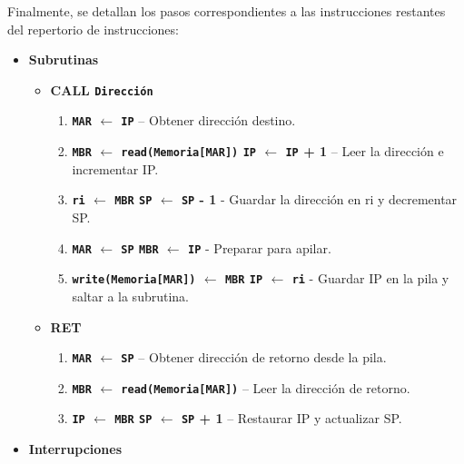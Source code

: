\documentclass[12pt,oneside]{templates/unerthesis}
\providecommand{\tightlist}{%
  \setlength{\itemsep}{0pt}\setlength{\parskip}{0pt}}
\begin{document}
Finalmente, se detallan los pasos correspondientes a las instrucciones restantes del repertorio de instrucciones:

\begin{itemize}
\tightlist
\item
  \textbf{Subrutinas}

  \begin{itemize}
  \tightlist
  \item
    \textbf{CALL \texttt{Dirección}}

    \begin{enumerate}
    \def\labelenumi{\arabic{enumi}.}
    \setcounter{enumi}{3}
    \tightlist
    \item
      \textbf{\texttt{MAR} \(\leftarrow\) \texttt{IP}} -- Obtener dirección destino.
    \item
      \textbf{\texttt{MBR} \(\leftarrow\) \texttt{read(Memoria{[}MAR{]})} \textbar{} \texttt{IP} \(\leftarrow\) \texttt{IP} + 1} -- Leer la dirección e incrementar IP.
    \item
      \textbf{\texttt{ri} \(\leftarrow\) \texttt{MBR} \textbar{} \texttt{SP} \(\leftarrow\) \texttt{SP} - 1} - Guardar la dirección en ri y decrementar SP.
    \item
      \textbf{\texttt{MAR} \(\leftarrow\) \texttt{SP} \textbar{} \texttt{MBR} \(\leftarrow\) \texttt{IP}} - Preparar para apilar.
    \item
      \textbf{\texttt{write(Memoria{[}MAR{]})} \(\leftarrow\) \texttt{MBR} \textbar{} \texttt{IP} \(\leftarrow\) \texttt{ri}} - Guardar IP en la pila y saltar a la subrutina.
    \end{enumerate}
  \item
    \textbf{RET}

    \begin{enumerate}
    \def\labelenumi{\arabic{enumi}.}
    \setcounter{enumi}{3}
    \tightlist
    \item
      \textbf{\texttt{MAR} \(\leftarrow\) \texttt{SP}} -- Obtener dirección de retorno desde la pila.
    \item
      \textbf{\texttt{MBR} \(\leftarrow\) \texttt{read(Memoria{[}MAR{]})}} -- Leer la dirección de retorno.
    \item
      \textbf{\texttt{IP} \(\leftarrow\) \texttt{MBR}\textbar{} \texttt{SP} \(\leftarrow\) \texttt{SP} + 1} -- Restaurar IP y actualizar SP.
    \end{enumerate}
  \end{itemize}
\item
  \textbf{Interrupciones}


\end{itemize}
\end{document}
